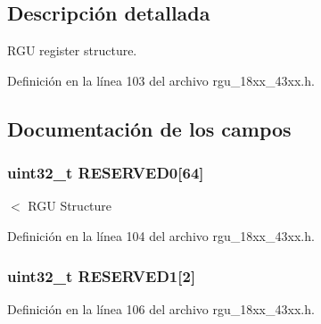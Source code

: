 \subsection{Descripción detallada}
R\+GU register structure. 

Definición en la línea 103 del archivo rgu\+\_\+18xx\+\_\+43xx.\+h.



\subsection{Documentación de los campos}
\subsubsection[{\texorpdfstring{R\+E\+S\+E\+R\+V\+E\+D0}{RESERVED0}}]{ uint32\+\_\+t R\+E\+S\+E\+R\+V\+E\+D0\mbox{[}64\mbox{]}}\hypertarget{struct_l_p_c___r_g_u___t_af58c5fd1a07d6436db757863729ffc99}{}\label{struct_l_p_c___r_g_u___t_af58c5fd1a07d6436db757863729ffc99}
$<$ R\+GU Structure 

Definición en la línea 104 del archivo rgu\+\_\+18xx\+\_\+43xx.\+h.

\subsubsection[{\texorpdfstring{R\+E\+S\+E\+R\+V\+E\+D1}{RESERVED1}}]{ uint32\+\_\+t R\+E\+S\+E\+R\+V\+E\+D1\mbox{[}2\mbox{]}}\hypertarget{struct_l_p_c___r_g_u___t_a67272bc257c032693d52097a78451784}{}\label{struct_l_p_c___r_g_u___t_a67272bc257c032693d52097a78451784}


Definición en la línea 106 del archivo rgu\+\_\+18xx\+\_\+43xx.\+h.

